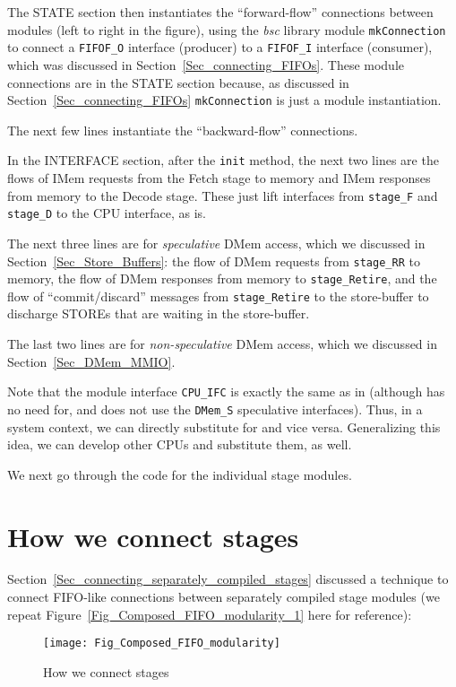 The STATE section then instantiates the ``forward-flow'' connections
between modules (left to right in the figure), using the \emph{bsc}
library module \verb|mkConnection| to connect a \verb|FIFOF_O|
interface (producer) to a \verb|FIFOF_I| interface (consumer), which
was discussed in Section~\ref{Sec_connecting_FIFOs}.  These module
connections are in the STATE section because, as discussed in
Section~\ref{Sec_connecting_FIFOs} \verb|mkConnection| is just a
module instantiation.

The next few lines instantiate the ``backward-flow'' connections.

In the INTERFACE section, after the \verb|init| method, the next two
lines are the flows of IMem requests from the Fetch stage to memory
and IMem responses from memory to the Decode stage.  These just lift
interfaces from \verb|stage_F| and \verb|stage_D| to the CPU
interface, as is.

The next three lines are for \emph{speculative} DMem access, which we
discussed in Section~\ref{Sec_Store_Buffers}: the flow of DMem
requests from \verb|stage_RR| to memory, the flow of DMem responses
from memory to \verb|stage_Retire|, and the flow of ``commit/discard''
messages from \verb|stage_Retire| to the store-buffer to discharge
STOREs that are waiting in the store-buffer.

The last two lines are for \emph{non-speculative} DMem access, which
we discussed in Section~\ref{Sec_DMem_MMIO}.

Note that the module interface \verb|CPU_IFC| is exactly the same as
in {\DRUM} (although {\DRUM} has no need for, and does not use the
\verb|DMem_S| speculative interfaces).  Thus, in a system context, we
can directly substitute {\DRUM} for {\FIFE} and vice versa.  Generalizing
this idea, we can develop other CPUs and substitute them, as well.

We next go through the code for the individual stage modules.


\section{How we connect stages}

\label{Sec_Fife_connections}

Section~\ref{Sec_connecting_separately_compiled_stages} discussed a
technique to connect FIFO-like connections between separately compiled
stage modules (we repeat Figure~\ref{Fig_Composed_FIFO_modularity_1}
here for reference):
\begin{figure}[htbp]
  \centerline{\texttt{[image: Fig\_Composed\_FIFO\_modularity]}}
  \caption{\label{Fig_Fife_connections}
           How we connect {\FIFE} stages}
\end{figure}

